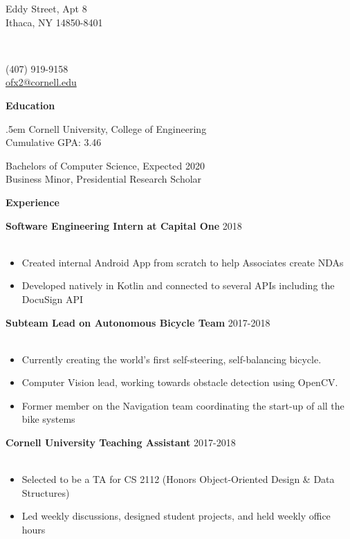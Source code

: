 \documentclass[12pt]{article}
\makeatletter
\newcommand{\name}{OLIVIA XIANG}
\newcommand{\addressPartOne}{311 Eddy Street, Apt 8}
\newcommand{\addressPartTwo}{Ithaca, NY 14850-8401}
\newcommand{\phoneNumber}{(407) 919-9158}
\newcommand{\email}{ofx2@cornell.edu}
\newcommand{\gpa}{3.46}
\newcommand{\header}[5]{
	\begin{minipage}{0.3\linewidth} 
		\fontsize{12}{0} \selectfont
		#2\\[.25em]
		#3\\
		\vspace{1em} 
	\end{minipage}
	\vspace{-.75em}
	\begin{minipage}{0.4\linewidth} 
		\fontsize{16}{0} \selectfont
		\center{\textbf{#1}}\\
		\vspace{2em} 
	\end{minipage}
	\begin{minipage}{0.25\linewidth}
		\begin{flushright}
			\fontsize{12}{0} \selectfont
			#4\\[.25em]
			#5\\
			\vspace{1em} 
		\end{flushright}
	\end{minipage}
	\makebox[\linewidth]{\rule{100em}{.4pt}}
	\vspace{-.4em}
}
\newcommand{\captionSplitLeft}[7]{
	\makeCaption{#1}{#2}
	
	\splitLeft{#3}{#4}{#5}{#6}{#7}
}
\newcommand{\splitLeft}[5]{
	\begin{minipage}{#3\linewidth}
		\begin{adjustwidth}{#1}{}
			\fontsize{11}{12} \selectfont
			#2
		\end{adjustwidth}
	\end{minipage}
	\begin{minipage}{#5\linewidth}
		\begin{flushleft}
			\fontsize{11}{12} \selectfont 
			#4
		\end{flushleft}
	\end{minipage} 
	\vspace{1em}
}
\newcommand{\makeCaption}[2]{
	\fontsize{14}{0} \selectfont
	\textbf{#1}
	\vspace{#2}
}
\newcommand{\group}[1]{
	\fontsize{14}{0} \selectfont
	\textbf{#1}
}
\newcommand{\jobCaption}[2]{
	\hspace{0.3em}
	\fontsize{12}{13} \selectfont
	\textbf{#1}
	\fontsize{11}{12} \selectfont 
	\hfill{#2}\\[.1em]
}
\makeatother
\begin{document}
	\header	{\name}
		{\addressPartOne}
		{\addressPartTwo}
		{\phoneNumber}
		{\href{mailto:\email}{\email}}



	\captionSplitLeft{Education}{.4em}{.5em}
		{Cornell University, College of Engineering\\
			Cumulative GPA: \gpa}{.5}
		{Bachelors of Computer Science, Expected 2020\\
			Business Minor, Presidential Research Scholar}{.5}
	\vspace{-.4em}

	\group{Experience}
	\vspace{.4em}
	
	\jobCaption{Software Engineering Intern at Capital One}{2018}\\[-1.75em]
	\begin{itemize}[leftmargin=1.5cm]
	\setlength\itemsep{-.25em}
	\fontsize{11}{0} \selectfont
	
	\item Created internal Android App from scratch to help Associates create NDAs
	\item Developed natively in Kotlin and connected to several APIs including the DocuSign API
	\end{itemize}
	\vspace{.7em}
	
	\jobCaption{Subteam Lead on Autonomous Bicycle Team}{2017-2018}\\[-1.75em]
	\begin{itemize}[leftmargin=1.5cm]
	\setlength\itemsep{-.25em}
	\fontsize{11}{0} \selectfont
	
	\item Currently creating the world's first self-steering, self-balancing bicycle. 
	\item Computer Vision lead, working towards obstacle detection using OpenCV.
	\item Former member on the Navigation team coordinating the start-up of all the bike systems
	\end{itemize}
	\vspace{.7em}
	
	\jobCaption{Cornell University Teaching Assistant}{2017-2018}\\[-1.75em]
	\begin{itemize}[leftmargin=1.5cm]
		\setlength\itemsep{-.25em}
		\fontsize{11}{0} \selectfont 
	
		\item Selected to be a TA for CS 2112 (Honors Object-Oriented Design \& Data Structures)
		\item Led weekly discussions, designed student projects, and held weekly office hours
	\end{itemize}
	\vspace{.7em}
\end{document}
